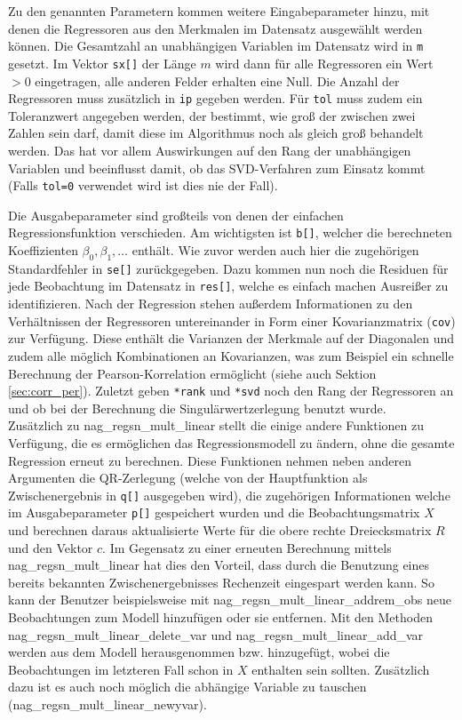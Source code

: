 Zu den genannten Parametern kommen weitere Eingabeparameter hinzu, mit denen die Regressoren aus den Merkmalen im Datensatz ausgewählt werden können.
Die Gesamtzahl an unabhängigen Variablen im Datensatz wird in \lstinline{m} gesetzt.
Im Vektor \lstinline{sx[]} der Länge $m$ wird dann für alle Regressoren ein Wert $>0$ eingetragen, alle anderen Felder erhalten eine Null.
Die Anzahl der Regressoren muss zusätzlich in \lstinline{ip} gegeben werden.
Für \lstinline{tol} muss zudem ein Toleranzwert angegeben werden, der bestimmt, wie groß der zwischen zwei Zahlen sein darf, damit diese im Algorithmus noch als gleich groß behandelt werden. 
Das hat vor allem Auswirkungen auf den Rang der unabhängigen Variablen und beeinflusst damit, ob das SVD-Verfahren zum Einsatz kommt (Falls \lstinline{tol=0} verwendet wird ist dies nie der Fall).

Die Ausgabeparameter sind großteils von denen der einfachen Regressionsfunktion verschieden.
Am wichtigsten ist \lstinline{b[]}, welcher die berechneten Koeffizienten $\beta_0, \beta_1, \dots$ enthält.
Wie zuvor werden auch hier die zugehörigen Standardfehler in \lstinline{se[]} zurückgegeben.
Dazu kommen nun noch die Residuen für jede Beobachtung im Datensatz in \lstinline{res[]}, welche es einfach machen Ausreißer zu identifizieren.
Nach der Regression stehen außerdem Informationen zu den Verhältnissen der Regressoren untereinander in Form einer Kovarianzmatrix (\lstinline{cov}) zur Verfügung.
Diese enthält die Varianzen der Merkmale auf der Diagonalen und zudem alle möglich Kombinationen an Kovarianzen, was zum Beispiel ein schnelle Berechnung der Pearson-Korrelation ermöglicht (siehe auch Sektion \ref{sec:corr_per}).
Zuletzt geben \lstinline{*rank} und \lstinline{*svd} noch den Rang der Regressoren an und ob bei der Berechnung die Singulärwertzerlegung benutzt wurde.
\\

Zusätzlich zu nag\_regsn\_mult\_linear stellt die \naglib einige andere Funktionen zu Verfügung, die es ermöglichen das Regressionsmodell zu ändern, ohne die gesamte Regression erneut zu berechnen.
Diese Funktionen nehmen neben anderen Argumenten die QR-Zerlegung (welche von der Hauptfunktion als Zwischenergebnis in \lstinline{q[]} ausgegeben wird), die zugehörigen Informationen welche im Ausgabeparameter \lstinline{p[]} gespeichert wurden und die Beobachtungsmatrix $X$ und berechnen daraus aktualisierte Werte für die obere rechte Dreiecksmatrix $R$ und den Vektor $c$.
Im Gegensatz zu einer erneuten Berechnung mittels nag\_regsn\_mult\_linear hat dies den Vorteil, dass durch die Benutzung eines bereits bekannten Zwischenergebnisses Rechenzeit eingespart werden kann.
So kann der Benutzer beispielsweise mit nag\_regsn\_mult\_linear\_addrem\_obs neue Beobachtungen zum Modell hinzufügen oder sie entfernen.
Mit den Methoden nag\_regsn\_mult\_linear\_delete\_var und nag\_regsn\_mult\_linear\_add\_var werden aus dem Modell herausgenommen bzw. hinzugefügt, wobei die Beobachtungen im letzteren Fall schon in $X$ enthalten sein sollten.
Zusätzlich dazu ist es auch noch möglich die abhängige Variable zu tauschen (nag\_regsn\_mult\_linear\_newyvar).


